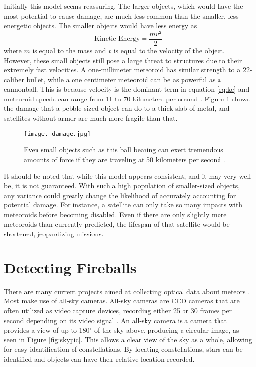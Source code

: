 Initially this model seems reassuring. The larger objects, which would have the most  potential to cause damage, are much less common than the smaller, less energetic objects. The smaller objects would have less energy as 
\begin{equation}
	\textrm{Kinetic Energy} = \frac{mv^2}{2}
	\label{eq:ke}
\end{equation}
where $m$ is equal to the mass and $v$ is equal to the velocity of the object. However, these small objects still pose a large threat to structures due to their extremely fast velocities. A one-millimeter meteoroid has similar strength to a 22-caliber bullet, while a one centimeter meteoroid can be as powerful as a cannonball. This is because velocity is the dominant term in equation \ref{eq:ke} and meteoroid speeds can range from 11 to 70 kilometers per second \cite{Harbaugh2008}. Figure \ref{fig:damage} shows the damage that a pebble-sized object can do to a thick slab of metal, and satellites without armor are much more fragile than that.

\begin{figure}[ht!]
  \centering
  \texttt{[image: damage.jpg]}
  \caption{Even small objects such as this ball bearing can exert tremendous amounts of force if they are traveling at 50 kilometers per second \protect\cite{ESA2017}.}
  \label{fig:damage}
\end{figure}


It should be noted that while this model appears consistent, and it may very well be, it is not guaranteed. With such a high population of smaller-sized objects, any variance could greatly change the likelihood of accurately accounting for potential damage. For instance, a satellite can only take so many impacts with meteoroids before becoming disabled. Even if there are only slightly more meteoroids than currently predicted, the lifespan of that satellite would be shortened, jeopardizing missions. 

\section{Detecting Fireballs}
There are many current projects aimed at collecting optical data about meteors \cite{Jenniskens2011,Trigo-Rodriguez2007,Halliday1996}. Most make use of all-sky cameras. All-sky cameras are CCD cameras that are often utilized as video capture devices, recording either 25 or 30 frames per second depending on its video signal \cite{Molau2005}. An all-sky camera is a camera that provides a view of up to 180$^{\circ}$ of the sky above, producing a circular image, as seen in Figure \ref{fig:skypic}. This allows a clear view of the sky as a whole, allowing for easy identification of constellations. By locating constellations, stars can be identified and objects can have their relative location recorded.

